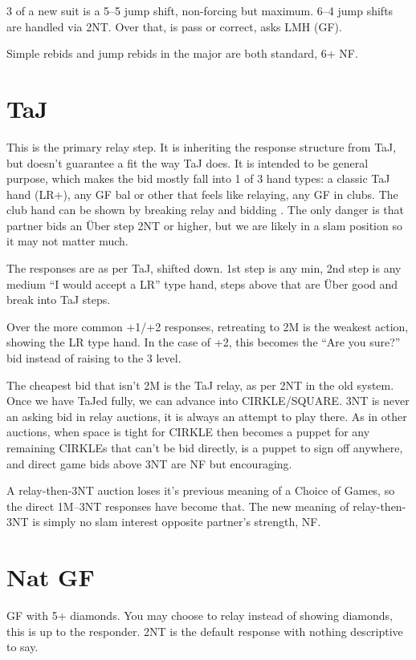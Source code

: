 \documentclass[tom-ari]{subfile}
\begin{document}
	3 of a new suit is a 5--5 jump shift, non-forcing but maximum. 6--4 jump shifts are handled via 2NT. Over that,  is pass or correct,  asks LMH (GF).
	
	Simple rebids and jump rebids in the major are both standard, 6+ NF.
		
	\section[2C TaJ]{ TaJ}
	
	This is the primary relay step.  It is inheriting the response structure from TaJ, but doesn't guarantee a fit the way TaJ does.  It is intended to be general purpose, which makes the bid mostly fall into 1 of 3 hand types:  a classic TaJ hand (LR+), any GF bal or other that feels like relaying, any GF in clubs.  The club hand can be shown by breaking relay and bidding . The only danger is that partner bids an \"Uber step 2NT or higher, but we are likely in a slam position so it may not matter much.
	
	The responses are as per TaJ, shifted down.  1st step is any min, 2nd step is any medium ``I would accept a LR'' type hand, steps above that are \"Uber good and break into TaJ steps.
	
	Over the more common +1/+2 responses, retreating to 2M is the weakest action, showing the LR type hand.  In the case of +2, this becomes the ``Are you sure?'' bid instead of raising to the 3 level.
	
	The cheapest bid that isn't 2M is the TaJ relay, as per 2NT in the old system.  Once we have TaJed fully, we can advance into CIRKLE/SQUARE. 3NT is never an asking bid in relay auctions, it is always an attempt to play there. As in other auctions, when space is tight for CIRKLE then  becomes a puppet for any remaining CIRKLEs that can't be bid directly,  is a puppet to sign off anywhere, and direct game bids above 3NT are NF but encouraging.

	A relay-then-3NT auction loses it's previous meaning of a Choice of Games, so the direct 1M--3NT responses have become that. The new meaning of relay-then-3NT is simply no slam interest opposite partner's strength, NF.
	
	\section[2D Nat GF]{ Nat GF}
	
	GF with 5+ diamonds. You may choose to relay instead of showing diamonds, this is up to the responder. 2NT is the default response with nothing descriptive to say.
	
\end{document}
